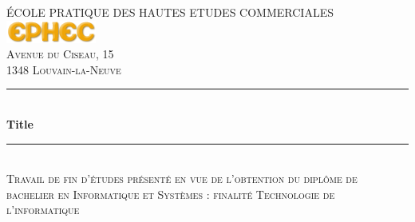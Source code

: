 \begin{titlepage}
\newcommand{\HRule}{\rule{\linewidth}{0.5mm}} %

\center %
 

\textsc{\LARGE ÉCOLE PRATIQUE DES HAUTES ETUDES COMMERCIALES}\\[1.5cm] %


\includegraphics{ephec.png}\\[1cm] %
 

\textsc{\large Avenue du Ciseau, 15}\\[0.5cm] %
\textsc{\large 1348 Louvain-la-Neuve}\\[0.5cm] %


\HRule \\[0.4cm]
{ \huge \bfseries Title}\\[0.4cm] %
\HRule \\[0.4cm]
\textsc{Travail de fin d'études présenté en vue de l'obtention du diplôme de bachelier en Informatique et Systèmes : finalité Technologie de l'informatique}\\[1.5cm] %
 


\end{titlepage}
